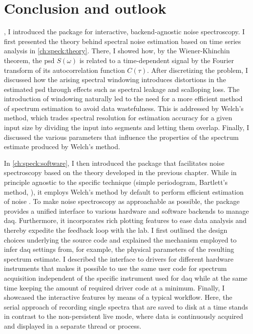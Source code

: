 \chapter{Conclusion and outlook}\label{ch:speck:conclusion}
 \thispart, I introduced the \pyspeck \python package for interactive, backend-agnostic noise spectroscopy.
I first presented the theory behind spectral noise estimation based on time series analysis in \cref{ch:speck:theory}.
There, I showed how, by the Wiener-Khinchin theorem, the \gls{psd} $S(\omega)$ is related to a time-dependent signal by the Fourier transform of its autocorrelation function $C(\tau)$.
After discretizing the problem, I discussed how the arising spectral windowing introduces distortions in the estimated \gls{psd} through effects such as spectral leakage and scalloping loss.
The introduction of windowing naturally led to the need for a more efficient method of spectrum estimation to avoid data wastefulness.
This is addressed by Welch's method, which trades spectral resolution for estimation accuracy for a given input size by dividing the input into segments and letting them overlap.
Finally, I discussed the various parameters that influence the properties of the spectrum estimate produced by Welch's method.

In \cref{ch:speck:software}, I then introduced the \pyspeck package that facilitates noise spectroscopy based on the theory developed in the previous chapter.
While in principle agnostic to the specific technique (simple periodogram, Bartlett's method, \etc), it employs Welch's method by default to perform efficient estimation of noise .
To make noise spectroscopy as approachable as possible, the package provides a unified interface to various hardware and software backends to manage \acrlong{daq}.
Furthermore, it incorporates rich plotting features to ease data analysis and thereby expedite the feedback loop with the lab.
I first outlined the design choices underlying the source code and explained the mechanism employed to infer \gls{daq} settings from, for example, the physical parameters of the resulting spectrum estimate.
I described the interface to drivers for different hardware instruments that makes it possible to use the same user code for spectrum acquisition independent of the specific instrument used for \acrlong{daq} while at the same time keeping the amount of required driver code at a minimum.
Finally, I showcased the interactive features by means of a typical workflow.
Here, the serial approach of recording single spectra that are saved to disk at a time stands in contrast to the non-persistent live mode, where data is continuously acquired and displayed in a separate thread or process.

